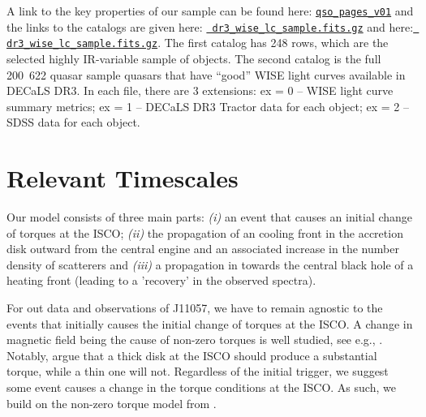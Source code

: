 \documentclass[11pt,a4paper]{article}
\begin{document}

A link to the key properties of our sample can be found here:
\href{http://portal.nersc.gov/project/cosmo/temp/ameisner/qso\_pages\_v01/}
{\tt qso\_pages\_v01} and the links to the catalogs are given here:
\href{http://portal.nersc.gov/project/cosmo/temp/ameisner/dr3_wise_lc_sample.fits.gz}{{\tt
dr3\_wise\_lc\_sample.fits.gz}} and here:
\href{http://portal.nersc.gov/project/cosmo/temp/ameisner/dr3_wise_lc_metrics_all_qso.fits.gz}{{\tt
dr3\_wise\_lc\_sample.fits.gz}}.  The first catalog has 248 rows,
which are the selected highly IR-variable sample of objects.  The
second catalog is the full \hbox{200 622} quasar sample quasars that
have ``good'' WISE light curves available in DECaLS DR3. In each file,
there are 3 extensions: ex = 0 -- WISE light curve summary metrics; ex
= 1 -- DECaLS DR3 Tractor data for each object; ex = 2 -- SDSS data
for each object.



\section*{Relevant Timescales}

Our model consists of three main parts: {\it (i)} an event that causes
an initial change of torques at the ISCO; {\it (ii)} the propagation
of an cooling front in the accretion disk outward from the central
engine and an associated increase in the number density of scatterers
and {\it (iii)} a propagation in towards the central black hole of a
heating front (leading to a 'recovery' in the observed spectra).

For out data and observations of J11057, we have to remain agnostic to
the events that initially causes the initial change of torques at the
ISCO.  A change in magnetic field being the cause of non-zero torques
is well studied, see e.g., \citet{Krolik1999, Gammie1999,
Agol_Krolik2000, Reynolds_Armitage2001}.  Notably,
\citet{Afshordi_Paczynski2003} argue that a thick disk at the ISCO
should produce a substantial torque, while a thin one will not.
Regardless of the initial trigger, we suggest some event causes 
a change in the torque conditions at the ISCO. As such, we build 
on the non-zero torque model from \citet{Zimmerman2005}. 
\end{document}
